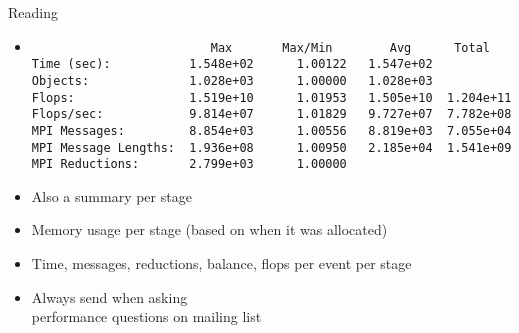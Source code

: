 \begin{frame}[fragile]{Reading }
\begin{itemize}
\item
{\scriptsize
\begin{verbatim}
                         Max       Max/Min        Avg      Total 
Time (sec):           1.548e+02      1.00122   1.547e+02
Objects:              1.028e+03      1.00000   1.028e+03
Flops:                1.519e+10      1.01953   1.505e+10  1.204e+11
Flops/sec:            9.814e+07      1.01829   9.727e+07  7.782e+08
MPI Messages:         8.854e+03      1.00556   8.819e+03  7.055e+04
MPI Message Lengths:  1.936e+08      1.00950   2.185e+04  1.541e+09
MPI Reductions:       2.799e+03      1.00000
\end{verbatim}}
\item Also a summary per stage
\item Memory usage per stage (based on when it was allocated)
\item Time, messages, reductions, balance, flops per event per stage
\item Always send  when asking \\
  performance questions on mailing list
\end{itemize}
\end{frame}

